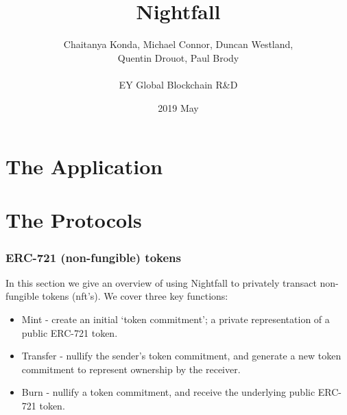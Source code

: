 \documentclass{article}
\title{Nightfall \footnotetext{Document prepared by Michael Connor}}
\date{2019 May}
\author{Chaitanya Konda, Michael Connor, Duncan Westland,\\
Quentin Drouot, Paul Brody\\
\\
EY Global Blockchain R\&D\\
}
\begin{document}
\maketitle %
\dosecttoc %
\dosectlof
\doparttoc %
\tableofcontents %










\newpage
\part{The Application}
\label{part:theApplication}
\parttoc

\newpage


\newpage


\newpage


\newpage


\newpage



\newpage
\part{The Protocols}
\label{part:theProtocols}
\parttoc

\newpage
\section{ERC-721 (non-fungible) tokens}
\label{sec:721}
\secttoc
\mtcskip
\sectlof

\newpage
\noindent
In this section we give an overview of using Nightfall to privately transact non-fungible tokens (nft's). We cover three key functions:
\begin{itemize}
	\item Mint - create an initial `token commitment'; a private representation of a public ERC-721 token.
	\item Transfer - nullify the sender's token commitment, and generate a new token commitment to represent ownership by the receiver.
	\item Burn - nullify a token commitment, and receive the underlying public ERC-721 token.
\end{itemize}
\end{document}
